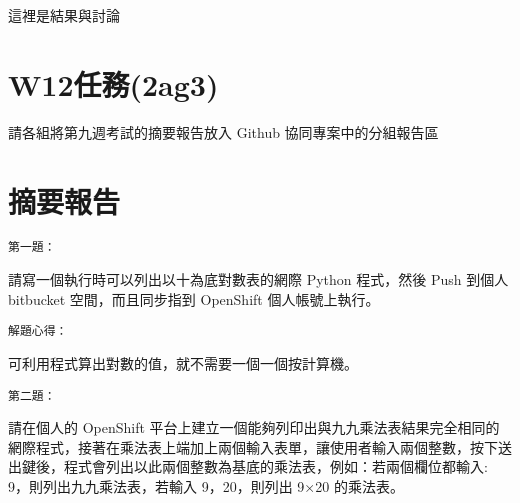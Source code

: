 \documentclass[]{article}
\newenvironment{Shaded}{}{}
\newcommand{\KeywordTok}[1]{\textcolor[rgb]{0.00,0.44,0.13}{\textbf{{#1}}}}
\newcommand{\DataTypeTok}[1]{\textcolor[rgb]{0.56,0.13,0.00}{{#1}}}
\newcommand{\DecValTok}[1]{\textcolor[rgb]{0.25,0.63,0.44}{{#1}}}
\newcommand{\CharTok}[1]{\textcolor[rgb]{0.25,0.44,0.63}{{#1}}}
\newcommand{\StringTok}[1]{\textcolor[rgb]{0.25,0.44,0.63}{{#1}}}
\newcommand{\OtherTok}[1]{\textcolor[rgb]{0.00,0.44,0.13}{{#1}}}
\newcommand{\NormalTok}[1]{{#1}}
\begin{document}
這裡是結果與討論

\section{W12任務(2ag3)}\label{w12ux4efbux52d92ag3}

請各組將第九週考試的摘要報告放入 Github 協同專案中的分組報告區

\section{摘要報告}\label{ux6458ux8981ux5831ux544a}

\begin{verbatim}
第一題：
\end{verbatim}

請寫一個執行時可以列出以十為底對數表的網際 Python 程式，然後 Push 到個人
bitbucket 空間，而且同步指到 OpenShift 個人帳號上執行。

\begin{Shaded}
\end{Shaded}

\begin{verbatim}
解題心得：
\end{verbatim}

可利用程式算出對數的值，就不需要一個一個按計算機。

\begin{verbatim}
第二題：
\end{verbatim}

請在個人的 OpenShift
平台上建立一個能夠列印出與九九乘法表結果完全相同的網際程式，接著在乘法表上端加上兩個輸入表單，讓使用者輸入兩個整數，按下送出鍵後，程式會列出以此兩個整數為基底的乘法表，例如：若兩個欄位都輸入:
9，則列出九九乘法表，若輸入 9，20，則列出 9×20 的乘法表。
\end{document}
